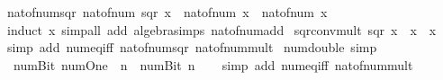 \begin{isabellebody}
\isanewline
{}\isamarkupfalse%
\ nat{\isacharunderscore}{\kern0pt}of{\isacharunderscore}{\kern0pt}num{\isacharunderscore}{\kern0pt}sqr{\isacharcolon}{\kern0pt}\ {\isachardoublequoteopen}nat{\isacharunderscore}{\kern0pt}of{\isacharunderscore}{\kern0pt}num\ {\isacharparenleft}{\kern0pt}sqr\ x{\isacharparenright}{\kern0pt}\ {\isacharequal}{\kern0pt}\ nat{\isacharunderscore}{\kern0pt}of{\isacharunderscore}{\kern0pt}num\ x\ {\isacharasterisk}{\kern0pt}\ nat{\isacharunderscore}{\kern0pt}of{\isacharunderscore}{\kern0pt}num\ x{\isachardoublequoteclose}\isanewline
%
\isadelimproof
\ \ %
\endisadelimproof
%
\isatagproof
{}\isamarkupfalse%
\ {\isacharparenleft}{\kern0pt}induct\ x{\isacharparenright}{\kern0pt}\ {\isacharparenleft}{\kern0pt}simp{\isacharunderscore}{\kern0pt}all\ add{\isacharcolon}{\kern0pt}\ algebra{\isacharunderscore}{\kern0pt}simps\ nat{\isacharunderscore}{\kern0pt}of{\isacharunderscore}{\kern0pt}num{\isacharunderscore}{\kern0pt}add{\isacharparenright}{\kern0pt}%
\endisatagproof
{\isafoldproof}%
%
\isadelimproof
\isanewline
%
\endisadelimproof
\isanewline
{}\isamarkupfalse%
\ sqr{\isacharunderscore}{\kern0pt}conv{\isacharunderscore}{\kern0pt}mult{\isacharcolon}{\kern0pt}\ {\isachardoublequoteopen}sqr\ x\ {\isacharequal}{\kern0pt}\ x\ {\isacharasterisk}{\kern0pt}\ x{\isachardoublequoteclose}\isanewline
%
\isadelimproof
\ \ %
\endisadelimproof
%
\isatagproof
{}\isamarkupfalse%
\ {\isacharparenleft}{\kern0pt}simp\ add{\isacharcolon}{\kern0pt}\ num{\isacharunderscore}{\kern0pt}eq{\isacharunderscore}{\kern0pt}iff\ nat{\isacharunderscore}{\kern0pt}of{\isacharunderscore}{\kern0pt}num{\isacharunderscore}{\kern0pt}sqr\ nat{\isacharunderscore}{\kern0pt}of{\isacharunderscore}{\kern0pt}num{\isacharunderscore}{\kern0pt}mult{\isacharparenright}{\kern0pt}%
\endisatagproof
{\isafoldproof}%
%
\isadelimproof
\isanewline
%
\endisadelimproof
\isanewline
{}\isamarkupfalse%
\ num{\isacharunderscore}{\kern0pt}double\ {\isacharbrackleft}{\kern0pt}simp{\isacharbrackright}{\kern0pt}{\isacharcolon}{\kern0pt}\isanewline
\ \ {\isachardoublequoteopen}num{\isachardot}{\kern0pt}Bit{}\ num{\isachardot}{\kern0pt}One\ {\isacharasterisk}{\kern0pt}\ n\ {\isacharequal}{\kern0pt}\ num{\isachardot}{\kern0pt}Bit{}\ n{\isachardoublequoteclose}\isanewline
%
\isadelimproof
\ \ %
\endisadelimproof
%
\isatagproof
{}\isamarkupfalse%
\ {\isacharparenleft}{\kern0pt}simp\ add{\isacharcolon}{\kern0pt}\ num{\isacharunderscore}{\kern0pt}eq{\isacharunderscore}{\kern0pt}iff\ nat{\isacharunderscore}{\kern0pt}of{\isacharunderscore}{\kern0pt}num{\isacharunderscore}{\kern0pt}mult{\isacharparenright}{\kern0pt}%

\end{isabellebody}
